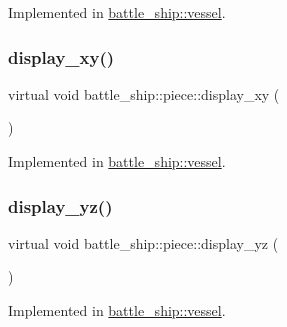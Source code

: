 Implemented in \hyperlink{classbattle__ship_1_1vessel_a9b99c5ed2629203985b25338df585234}{battle\+\_\+ship\+::vessel}.

\mbox{\label{classbattle__ship_1_1piece_a0f900b13641277ae9e809e4baa5c8c10}} 
\subsubsection{\texorpdfstring{display\+\_\+xy()}{display\_xy()}}
{\footnotesize\ttfamily virtual void battle\+\_\+ship\+::piece\+::display\+\_\+xy (\begin{DoxyParamCaption}{ }\end{DoxyParamCaption})\hspace{0.3cm}{\ttfamily [pure virtual]}}



Implemented in \hyperlink{classbattle__ship_1_1vessel_a60924b058d686ebf545ae8f4d9f42d76}{battle\+\_\+ship\+::vessel}.

\mbox{\label{classbattle__ship_1_1piece_ad46ddc76d6e682a4f1fc8965a0c7813c}} 
\subsubsection{\texorpdfstring{display\+\_\+yz()}{display\_yz()}}
{\footnotesize\ttfamily virtual void battle\+\_\+ship\+::piece\+::display\+\_\+yz (\begin{DoxyParamCaption}{ }\end{DoxyParamCaption})\hspace{0.3cm}{\ttfamily [pure virtual]}}



Implemented in \hyperlink{classbattle__ship_1_1vessel_aa4f50939cb109b09c6b300313e193198}{battle\+\_\+ship\+::vessel}.

\mbox{\label{classbattle__ship_1_1piece_a63f00d666a65cd41a11b592d55411b7f}} 
